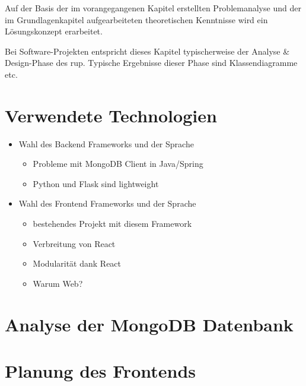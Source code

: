 Auf der Basis der im vorangegangenen Kapitel erstellten Problemanalyse 
und der im Grundlagenkapitel aufgearbeiteten theoretischen Kenntnisse 
wird ein Lösungskonzept erarbeitet.

Bei Software-Projekten entspricht dieses Kapitel typischerweise der 
Analyse \& Design-Phase des \ac{rup}. Typische Ergebnisse dieser Phase sind 
Klassendiagramme etc.

\section{Verwendete Technologien}
\label{sec:verwendete_technologien}

\begin{itemize}
    \item Wahl des Backend Frameworks  und der Sprache
    \begin{itemize}
        \item Probleme mit MongoDB Client in Java/Spring
        \item Python und Flask sind lightweight
    \end{itemize}
    \item Wahl des Frontend Frameworks und der Sprache
    \begin{itemize}
        \item bestehendes Projekt mit diesem Framework
        \item Verbreitung von React
        \item Modularität dank React
        \item Warum Web?
    \end{itemize}
\end{itemize}

\section{Analyse der MongoDB Datenbank}
\label{sec:mongoDB_analyse}

\section{Planung des Frontends}
\label{sec:planung_frontend}
